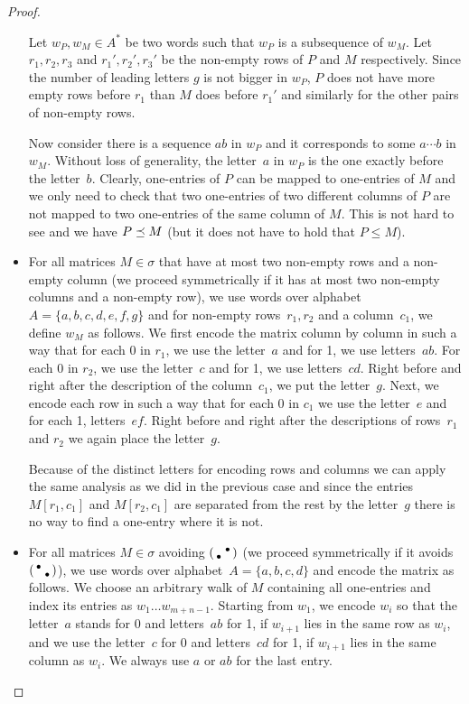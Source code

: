 \begin{proof}
\begin{itemize}
		Let $w_P,w_M\in A^*$ be two words such that $w_P$ is a subsequence of $w_M$. Let $r_1,r_2,r_3$ and $r_1',r_2',r_3'$ be the non-empty rows of $P$ and $M$ respectively. Since the number of leading letters $g$ is not bigger in $w_P$, $P$ does not have more empty rows before $r_1$ than $M$ does before $r_1'$ and similarly for the other pairs of non-empty rows.

		Now consider there is a sequence $ab$ in $w_P$ and it corresponds to some $a\cdots b$ in $w_M$. Without loss of generality, the letter~$a$ in $w_P$ is the one exactly before the letter~$b$. Clearly, one-entries of $P$ can be mapped to one-entries of $M$ and we only need to check that two one-entries of two different columns of $P$ are not mapped to two one-entries of the same column of $M$. This is not hard to see and we have $P\preceq M$ (but it does not have to hold that $P\leq M$).
	\item For all matrices $M\in\sigma$ that have at most two non-empty rows and a non-empty column (we proceed symmetrically if it has at most two non-empty columns and a non-empty row), we use words over alphabet~$A=\{a,b,c,d,e,f,g\}$ and for non-empty rows~$r_1,r_2$ and a column~$c_1$, we define $w_M$ as follows. We first encode the matrix column by column in such a way that for each 0 in $r_1$, we use the letter~$a$ and for 1, we use letters~$ab$. For each 0 in $r_2$, we use the letter~$c$ and for 1, we use letters~$cd$. Right before and right after the description of the column~$c_1$, we put the letter~$g$. Next, we encode each row in such a way that for each 0 in $c_1$ we use the letter~$e$ and for each 1, letters~$ef$. Right before and right after the descriptions of rows~$r_1$ and $r_2$ we again place the letter~$g$.
		
		Because of the distinct letters for encoding rows and columns we can apply the same analysis as we did in the previous case and since the entries $M[r_1,c_1]$ and $M[r_2,c_1]$ are separated from the rest by the letter~$g$ there is no way to find a one-entry where it is not.
	\item For all matrices $M\in\sigma$ avoiding $\left(\begin{smallmatrix} &\bullet\\\bullet& \end{smallmatrix}\right)$ (we proceed symmetrically if it avoids $\left(\begin{smallmatrix}\bullet& \\ &\bullet\end{smallmatrix}\right)$), we use words over alphabet~$A=\{a,b,c,d\}$ and encode the matrix as follows. We choose an arbitrary walk of $M$ containing all one-entries and index its entries as $w_1\dots w_{m+n-1}$. Starting from $w_1$, we encode $w_i$ so that the letter~$a$ stands for 0 and letters~$ab$ for 1, if $w_{i+1}$ lies in the same row as $w_i$, and we use the letter~$c$ for 0 and letters~$cd$ for 1, if $w_{i+1}$ lies in the same column as $w_i$. We always use $a$ or $ab$ for the last entry.
	

\end{itemize}
\end{proof}
